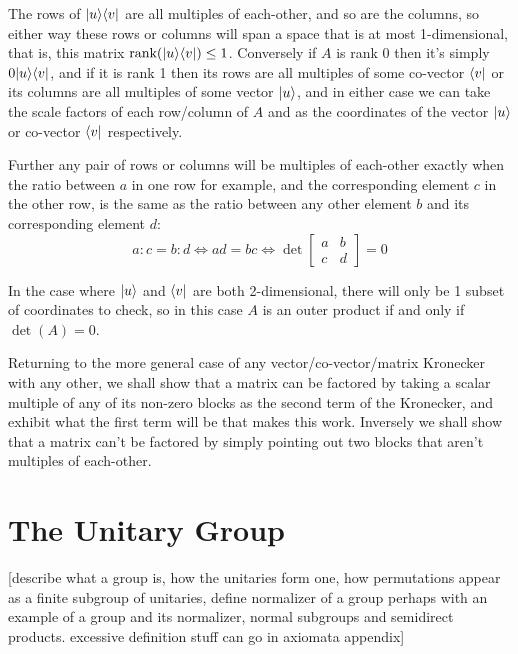 The rows of $| u \rangle\langle v |$ are all multiples of each-other, and so are the columns, so either way these rows or columns will span a space that is at most 1-dimensional, that is, this matrix $\text{rank}(| u \rangle\langle v |) \leq 1$. Conversely if $A$ is rank 0 then it's simply $0| u \rangle\langle v |$, and if it is rank 1 then its rows are all multiples of some co-vector $\langle v |$ or its columns are all multiples of some vector $| u \rangle$, and in either case we can take the scale factors of each row/column of $A$ and as the coordinates of the vector $| u \rangle$ or co-vector $\langle v |$ respectively.

Further any pair of rows or columns will be multiples of each-other exactly when the ratio between $a$ in one row for example, and the corresponding element $c$ in the other row, is the same as the ratio between any other element $b$ and its corresponding element $d$:
\[a:c = b:d \iff ad = bc \iff \det\left[\begin{matrix}a&b\\c&d
\end{matrix}\right] = 0\]

In the case where $| u \rangle$ and $\langle v |$ are both 2-dimensional, there will only be 1 subset of coordinates to check, so in this case $A$ is an outer product if and only if $\det(A) = 0$.

Returning to the more general case of any vector/co-vector/matrix Kronecker with any other, we shall show that a matrix can be factored by taking a scalar multiple of any of its non-zero blocks as the second term of the Kronecker, and exhibit what the first term will be that makes this work. Inversely we shall show that a matrix can't be factored by simply pointing out two blocks that aren't multiples of each-other.
\section{The Unitary Group}
[describe what a group is, how the unitaries form one, how permutations appear as a finite subgroup of unitaries, define normalizer of a group perhaps with an example of a group and its normalizer, normal subgroups and semidirect products. excessive definition stuff can go in axiomata appendix]
